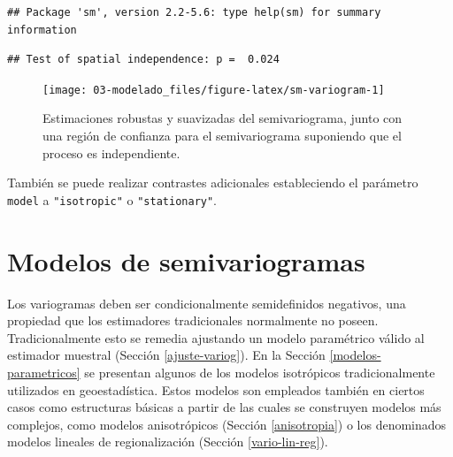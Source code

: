 \documentclass[
  spanish,
]{book}
\newenvironment{Shaded}{\begin{snugshade}}{\end{snugshade}}
\newcommand{\AttributeTok}[1]{\textcolor[rgb]{0.77,0.63,0.00}{#1}}
\newcommand{\FunctionTok}[1]{\textcolor[rgb]{0.00,0.00,0.00}{#1}}
\newcommand{\NormalTok}[1]{#1}
\newcommand{\SpecialCharTok}[1]{\textcolor[rgb]{0.00,0.00,0.00}{#1}}
\newcommand{\StringTok}[1]{\textcolor[rgb]{0.31,0.60,0.02}{#1}}
\theoremstyle{break}
\theoremstyle{definition}
\theoremstyle{definition}
\theoremstyle{definition}
\theoremstyle{definition}
\theoremstyle{remark}
\begin{document}
\begin{verbatim}
## Package 'sm', version 2.2-5.6: type help(sm) for summary information
\end{verbatim}

\begin{Shaded}
\end{Shaded}

\begin{verbatim}
## Test of spatial independence: p =  0.024
\end{verbatim}

\begin{figure}[!htb]

{\centering \texttt{[image: 03-modelado\_files/figure-latex/sm-variogram-1]} 

}

\caption{Estimaciones robustas y suavizadas del semivariograma, junto con una región de confianza para el semivariograma suponiendo que el proceso es independiente.}\label{fig:sm-variogram}
\end{figure}

También se puede realizar contrastes adicionales estableciendo el parámetro \texttt{model} a \texttt{"isotropic"} o \texttt{"stationary"}.

\hypertarget{modelos-variog}{%
\section{Modelos de semivariogramas}\label{modelos-variog}}

Los variogramas deben ser condicionalmente semidefinidos negativos, una propiedad que los estimadores tradicionales normalmente no poseen.
Tradicionalmente esto se remedia ajustando un modelo paramétrico válido al estimador muestral (Sección \ref{ajuste-variog}).
En la Sección \ref{modelos-parametricos} se presentan algunos de los modelos isotrópicos tradicionalmente utilizados en geoestadística.
Estos modelos son empleados también en ciertos casos como estructuras básicas a partir de las cuales se construyen modelos más complejos, como modelos anisotrópicos (Sección \ref{anisotropia}) o los denominados modelos lineales de regionalización (Sección \ref{vario-lin-reg}).
\end{document}
